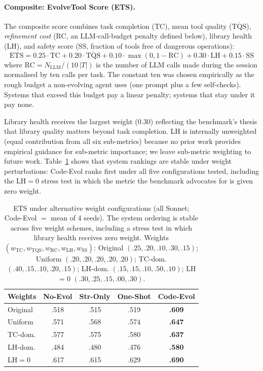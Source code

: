 \documentclass[sigplan,nonacm,natbib=false]{acmart}
\begin{document}
\paragraph{Composite: EvolveTool Score (ETS).}
The composite score combines task completion (TC), mean tool quality ($\overline{\text{TQS}}$), \emph{refinement cost} (RC, an LLM-call-budget penalty defined below), library health (LH), and safety score (SS, fraction of tools free of dangerous operations):
\begin{equation}
\text{ETS} = 0.25 \!\cdot\! \text{TC} + 0.20 \!\cdot\! \overline{\text{TQS}} + 0.10 \!\cdot\! \max(0, 1{-}\text{RC}) + 0.30 \!\cdot\! \text{LH} + 0.15 \!\cdot\! \text{SS}
\end{equation}
where $\text{RC} = N_{\text{LLM}} / (10\,|T|)$ is the number of LLM calls made during the session normalised by ten calls per task. The constant ten was chosen empirically as the rough budget a non-evolving agent uses (one prompt plus a few self-checks). Systems that exceed this budget pay a linear penalty; systems that stay under it pay none.

Library health receives the largest weight (0.30) reflecting the benchmark's thesis that library quality matters beyond task completion. LH is internally unweighted (equal contribution from all six sub-metrics) because no prior work provides empirical guidance for sub-metric importance; we leave sub-metric weighting to future work. Table~\ref{tab:ets_sensitivity} shows that system rankings are stable under weight perturbations: Code-Evol ranks first under all five configurations tested, including the LH$=$0 stress test in which the metric the benchmark advocates for is given zero weight.

\begin{table}[t]
\centering\footnotesize
\begin{tabular}{lcccc}
\toprule
\textbf{Weights} & \textbf{No-Evol} & \textbf{Str-Only} & \textbf{One-Shot} & \textbf{Code-Evol} \\
\midrule
Original   & .518 & .515 & .519 & \textbf{.609} \\
Uniform    & .571 & .568 & .574 & \textbf{.647} \\
TC-dom.    & .577 & .575 & .580 & \textbf{.637} \\
LH-dom.    & .484 & .480 & .476 & \textbf{.580} \\
LH${=}$0   & .617 & .615 & .629 & \textbf{.690} \\
\bottomrule
\end{tabular}
\caption{ETS under alternative weight configurations (all Sonnet; Code-Evol $=$ mean of 4 seeds). The system ordering is stable across five weight schemes, including a stress test in which library health receives zero weight. Weights $(w_{\text{TC}}, w_{\text{TQS}}, w_{\text{RC}}, w_{\text{LH}}, w_{\text{SS}})$: Original $(.25,.20,.10,.30,.15)$; Uniform $(.20,.20,.20,.20,.20)$; TC-dom. $(.40,.15,.10,.20,.15)$; LH-dom. $(.15,.15,.10,.50,.10)$; LH${=}$0 $(.30,.25,.15,.00,.30)$.}
\label{tab:ets_sensitivity}
\end{table}
\end{document}
